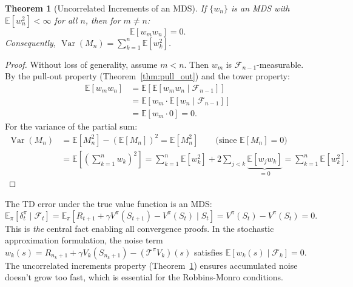 \documentclass[11pt,a4paper]{article}
\theoremstyle{definition}
\theoremstyle{plain}
\newtheorem{theorem}{Theorem}[section]
\theoremstyle{remark}
\DeclareMathOperator{\Var}{Var}
\newcommand{\E}{\mathbb{E}}
\begin{document}
\begin{theorem}[Uncorrelated Increments of an MDS]
\label{thm:mds_uncorrelated}
If $\{w_n\}$ is an MDS with $\E[w_n^2] < \infty$ for all $n$, then for $m \neq n$:
\begin{equation}
    \E[w_m w_n] = 0.
    \label{eq:mds_uncorrelated}
\end{equation}
Consequently, $\Var(M_n) = \sum_{k=1}^n \E[w_k^2]$.
\end{theorem}

\begin{proof}
Without loss of generality, assume $m < n$. Then $w_m$ is $\mathcal{F}_{n-1}$-measurable. By the pull-out property (Theorem~\ref{thm:pull_out}) and the tower property:
\begin{align}
    \E[w_m w_n]
    &= \E[\E[w_m w_n \mid \mathcal{F}_{n-1}]] \nonumber\\
    &= \E[w_m \cdot \E[w_n \mid \mathcal{F}_{n-1}]] \nonumber\\
    &= \E[w_m \cdot 0] = 0. \label{eq:mds_uncorrelated_proof}
\end{align}
For the variance of the partial sum:
\begin{align}
    \Var(M_n) &= \E[M_n^2] - (\E[M_n])^2 = \E[M_n^2] \qquad \text{(since } \E[M_n] = 0\text{)} \nonumber\\
    &= \E\!\left[\left(\sum_{k=1}^n w_k\right)^2\right]
    = \sum_{k=1}^n \E[w_k^2] + 2\sum_{j < k} \underbrace{\E[w_j w_k]}_{= 0}
    = \sum_{k=1}^n \E[w_k^2]. \label{eq:mds_var_proof}
\end{align}
\end{proof}

\begin{tdconnection}
The TD error under the true value function is an MDS:
\[
    \E_\pi[\delta_t^\pi \mid \mathcal{F}_t] = \E_\pi[R_{t+1} + \gamma V^\pi(S_{t+1}) - V^\pi(S_t) \mid S_t] = V^\pi(S_t) - V^\pi(S_t) = 0.
\]
This is \emph{the} central fact enabling all convergence proofs. In the stochastic approximation formulation, the noise term $w_k(s) = R_{n_k+1} + \gamma V_k(S_{n_k+1}) - (\mathcal{T}^\pi V_k)(s)$ satisfies $\E[w_k(s) \mid \mathcal{F}_k] = 0$. The uncorrelated increments property (Theorem~\ref{thm:mds_uncorrelated}) ensures accumulated noise doesn't grow too fast, which is essential for the Robbins-Monro conditions.
\end{tdconnection}

\end{document}

